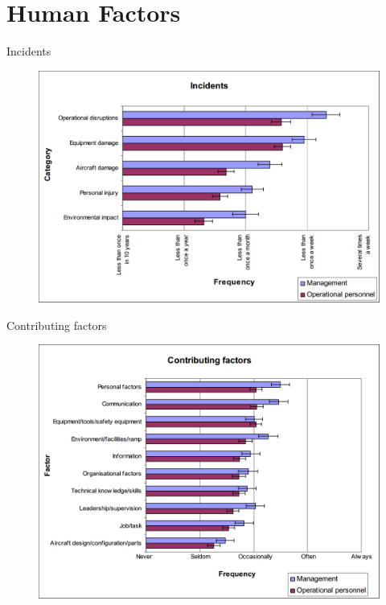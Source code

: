 \section{Human Factors}
\begin{frame}{Incidents}{}
	\begin{figure}[H]
	\centering
	\includegraphics[width=\textwidth]{Grafik/FrequencyOfIncidents}
\end{figure}
\end{frame}

\begin{frame}{Contributing factors}{}
	\begin{figure}[H]
	\centering
	\includegraphics[width=\textwidth]{Grafik/ContributingFactors}
\end{figure}
\end{frame}

